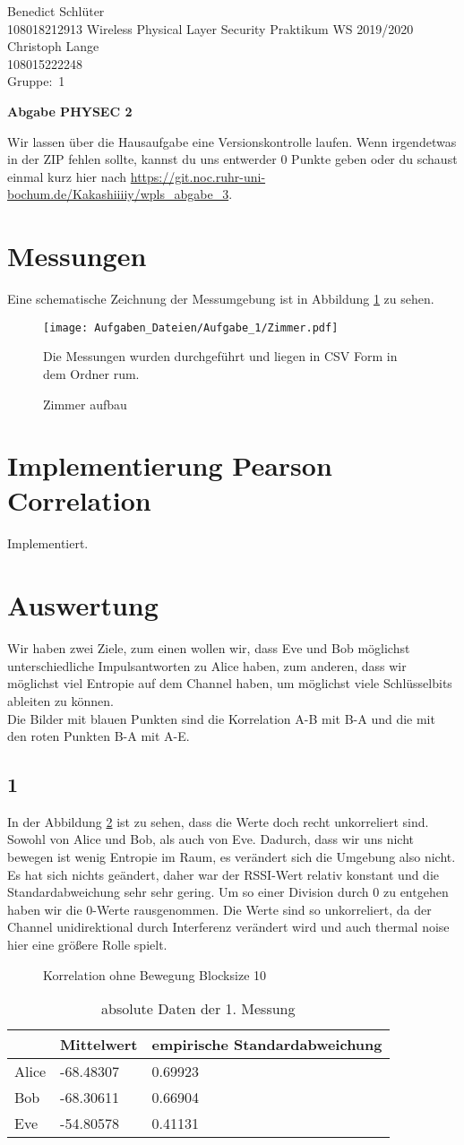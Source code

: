 \documentclass[12pt,a4paper]{article}
\newcommand{\student}{Benedict Schlüter\\ 108018212913 } %
\newcommand{\partner}{Christoph Lange\\ 108015222248} %
\newcommand{\group}{1} %
\newcommand{\hwheadtwo}{$ $
  \vspace{-2cm}
  
\noindent \student \qquad \qquad  Wireless Physical Layer Security Praktikum \hfill WS 2019/2020 \\
\noindent \partner \\
\noindent Gruppe:~\group\\
$ $

  
\begin{center}    
{\Large \bf Abgabe PHYSEC 2}
\end{center}
}
\begin{document}
\hwheadtwo
Wir lassen über die Hausaufgabe eine Versionskontrolle laufen. Wenn irgendetwas in der ZIP fehlen sollte, kannst du uns entwerder 0 Punkte geben oder du schaust einmal kurz hier nach \url{https://git.noc.ruhr-uni-bochum.de/Kakashiiiiy/wpls_abgabe_3}.
\section{Messungen}
Eine schematische Zeichnung der Messumgebung ist in Abbildung \ref{fig:1_1} zu sehen.
\begin{figure}[H]
\centering
\texttt{[image: Aufgaben\_Dateien/Aufgabe\_1/Zimmer.pdf]} 
\caption{Zimmer aufbau}
\label{fig:1_1}
Die Messungen wurden durchgeführt und liegen in CSV Form in dem Ordner rum.
\end{figure}
\section{Implementierung Pearson Correlation}
Implementiert.
\section{Auswertung}
Wir haben zwei Ziele, zum einen wollen wir, dass Eve und Bob möglichst unterschiedliche Impulsantworten zu Alice haben, zum anderen, dass wir möglichst viel Entropie auf dem Channel haben, um möglichst viele Schlüsselbits ableiten zu können.\\
Die Bilder mit blauen Punkten sind die Korrelation A-B mit B-A und die mit den roten Punkten B-A mit A-E.
\subsection*{1}
In der Abbildung \ref{fig:1} ist zu sehen, dass die Werte doch recht unkorreliert sind. Sowohl von Alice und Bob, als auch von Eve. Dadurch, dass wir uns nicht bewegen ist wenig Entropie im Raum, es verändert sich die Umgebung also nicht. Es hat sich nichts geändert, daher war der RSSI-Wert relativ konstant und die Standardabweichung sehr sehr gering. Um so einer Division durch 0 zu entgehen haben wir die 0-Werte rausgenommen. Die Werte sind so unkorreliert, da der Channel unidirektional durch Interferenz verändert wird und auch thermal noise hier eine größere Rolle spielt. 
\begin{figure}[H]
\centering
{} \qquad
{}
\caption{Korrelation ohne Bewegung Blocksize 10}
\label{fig:1}
\end{figure}
\begin{table}[H]
\centering
\begin{tabular}{l|l|l}
& Mittelwert & empirische Standardabweichung \\
\hline
Alice & -68.48307 & 0.69923 \\
\hline
Bob & -68.30611 & 0.66904 \\
\hline
Eve & -54.80578 & 0.41131 \\
\end{tabular}
\caption{absolute Daten der 1. Messung}
\end{table}
\end{document}
